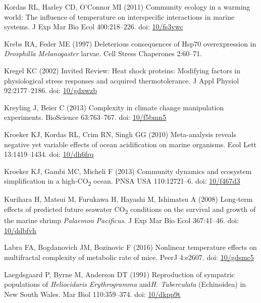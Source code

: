 \documentclass[a4paper,10pt, oneside]{memoir}
\begin{document}
\leavevmode\hypertarget{ref-Kordas2011}{}%
Kordas RL, Harley CD, O'Connor MI (2011) Community ecology in a warming world: The influence of temperature on interspecific interactions in marine systems. J Exp Mar Bio Ecol 400:218--226. doi: \href{https://doi.org/10/fs3vwc}{10/fs3vwc}

\leavevmode\hypertarget{ref-Krebs1997}{}%
Krebs RA, Feder ME (1997) Deleterious consequences of Hsp70 overexpression in \emph{Drosphilla} \emph{Melanogaster} larvae. Cell Stress Chaperones 2:60--71.

\leavevmode\hypertarget{ref-Kregel2002}{}%
Kregel KC (2002) Invited Review: Heat shock proteins: Modifying factors in physiological stress responses and acquired thermotolerance. J Appl Physiol 92:2177--2186. doi: \href{https://doi.org/10/gdxwzb}{10/gdxwzb}

\leavevmode\hypertarget{ref-Kreyling2013}{}%
Kreyling J, Beier C (2013) Complexity in climate change manipulation experiments. BioScience 63:763--767. doi: \href{https://doi.org/10/f5bmn5}{10/f5bmn5}

\leavevmode\hypertarget{ref-Kroeker2010}{}%
Kroeker KJ, Kordas RL, Crim RN, Singh GG (2010) Meta-analysis reveals negative yet variable effects of ocean acidification on marine organisms. Ecol Lett 13:1419--1434. doi: \href{https://doi.org/10/dh6frq}{10/dh6frq}

\leavevmode\hypertarget{ref-Kroeker2013}{}%
Kroeker KJ, Gambi MC, Micheli F (2013) Community dynamics and ecosystem simplification in a high-CO\textsubscript{2} ocean. PNSA USA 110:12721--6. doi: \href{https://doi.org/10/f467d3}{10/f467d3}

\leavevmode\hypertarget{ref-Kurihara2008}{}%
Kurihara H, Matsui M, Furukawa H, Hayashi M, Ishimatsu A (2008) Long-term effects of predicted future seawater CO\textsubscript{2} conditions on the survival and growth of the marine shrimp \emph{Palaemon} \emph{Pacificus}. J Exp Mar Bio Ecol 367:41--46. doi: \href{https://doi.org/10/ddbfvh}{10/ddbfvh}

\leavevmode\hypertarget{ref-Labra2016}{}%
Labra FA, Bogdanovich JM, Bozinovic F (2016) Nonlinear temperature effects on multifractal complexity of metabolic rate of mice. PeerJ 4:e2607. doi: \href{https://doi.org/10/gdsmc5}{10/gdsmc5}

\leavevmode\hypertarget{ref-Laegdsgaard1991}{}%
Laegdsgaard P, Byrne M, Anderson DT (1991) Reproduction of sympatric populations of \emph{Heliocidaris} \emph{Erythrogramma} and\emph{H}\emph{. Tuberculata} (Echinoidea) in New South Wales. Mar Biol 110:359--374. doi: \href{https://doi.org/10/dkpp9t}{10/dkpp9t}
\end{document}
